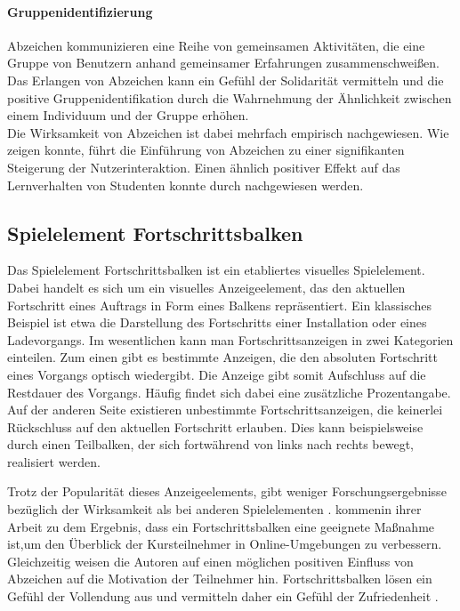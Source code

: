 \paragraph{Gruppenidentifizierung}
Abzeichen kommunizieren eine Reihe von gemeinsamen Aktivitäten, die eine Gruppe von Benutzern anhand gemeinsamer Erfahrungen zusammenschweißen. Das Erlangen von Abzeichen kann ein Gefühl der Solidarität vermitteln und die positive Gruppenidentifikation durch die Wahrnehmung der Ähnlichkeit zwischen einem Individuum und der Gruppe erhöhen.\\

Die Wirksamkeit von Abzeichen ist dabei mehrfach empirisch nachgewiesen. Wie \citeauthor{hamari_badges_2017} zeigen konnte, führt die Einführung von Abzeichen zu einer signifikanten Steigerung der Nutzerinteraktion. Einen ähnlich positiver Effekt auf das Lernverhalten von Studenten konnte durch \citeauthor{hamzah_influence_2015} nachgewiesen werden.


\subsection{Spielelement Fortschrittsbalken}
Das Spielelement Fortschrittsbalken ist ein etabliertes visuelles Spielelement.
Dabei handelt es sich um ein visuelles Anzeigeelement, das den aktuellen Fortschritt eines Auftrags in Form eines Balkens repräsentiert. Ein klassisches Beispiel ist etwa die Darstellung des Fortschritts einer Installation oder eines Ladevorgangs. Im wesentlichen kann man Fortschrittsanzeigen in zwei Kategorien einteilen. Zum einen gibt es bestimmte Anzeigen, die den absoluten Fortschritt  eines Vorgangs optisch wiedergibt. Die Anzeige gibt somit Aufschluss auf die Restdauer des Vorgangs. Häufig findet sich dabei eine zusätzliche Prozentangabe. Auf der anderen Seite existieren unbestimmte Fortschrittsanzeigen, die keinerlei Rückschluss auf den aktuellen Fortschritt erlauben. Dies kann beispielsweise durch einen Teilbalken, der sich fortwährend von links nach rechts bewegt, realisiert werden.

Trotz der Popularität dieses Anzeigeelements, gibt weniger Forschungsergebnisse bezüglich der Wirksamkeit als bei anderen Spielelementen \cite{koivisto_rise_2019}.
\citeauthor{olsson_visualisation_2016} kommenin ihrer Arbeit zu dem Ergebnis, dass ein Fortschrittsbalken eine geeignete Maßnahme ist,um den Überblick der Kursteilnehmer in Online-Umgebungen zu verbessern. Gleichzeitig weisen die Autoren auf einen möglichen positiven Einfluss von Abzeichen auf die Motivation der Teilnehmer hin. Fortschrittsbalken lösen ein Gefühl der Vollendung aus und vermitteln daher ein Gefühl der Zufriedenheit \cite{ryan_deci_2000}.


